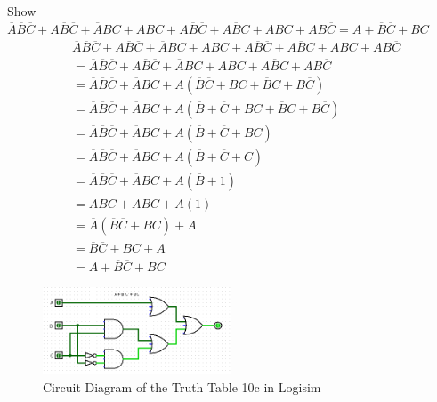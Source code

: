 \documentclass[12pt]{article}
\begin{document}
\begin{enumerate}
\begin{enumerate}
      Show $\overline{A}\overline{B}\overline{C} + A\overline{B}\overline{C} + \overline{A}BC + ABC + A\overline{B}\overline{C} + A\overline{B}C + ABC + AB\overline{C} = A + \overline{B}\overline{C} + BC$
      \begin{align*}
        &\overline{A}\overline{B}\overline{C} + A\overline{B}\overline{C} + \overline{A}BC + ABC + A\overline{B}\overline{C} + A\overline{B}C + ABC + AB\overline{C}\\
        &=\overline{A}\overline{B}\overline{C} + A\overline{B}\overline{C} + \overline{A}BC + ABC + A\overline{B}C + AB\overline{C}\\
        &=\overline{A}\overline{B}\overline{C} + \overline{A}BC + A(\overline{B}\overline{C} + BC + \overline{B}C + B\overline{C})\\
        &=\overline{A}\overline{B}\overline{C} + \overline{A}BC + A(\overline{B} + \overline{C} + BC + \overline{B}C + B\overline{C})\\
        &=\overline{A}\overline{B}\overline{C} + \overline{A}BC + A(\overline{B} + \overline{C} + BC)\\
        &=\overline{A}\overline{B}\overline{C} + \overline{A}BC + A(\overline{B} + \overline{C} + C)\\
        &=\overline{A}\overline{B}\overline{C} + \overline{A}BC + A(\overline{B} + 1)\\
        &=\overline{A}\overline{B}\overline{C} + \overline{A}BC + A(1)\\
        &=\overline{A}(\overline{B}\overline{C} + BC) + A\\
        &=\overline{B}\overline{C} + BC + A\\
        &=A + \overline{B}\overline{C} + BC
      \end{align*}

      \begin{figure}[h]
        \centering
        \includegraphics[width=0.5\textwidth]{assn/02/media/10c.png}
        \caption{Circuit Diagram of the Truth Table 10c in Logisim}
      \end{figure}

    \end{enumerate}

  \end{enumerate}
\end{document}
